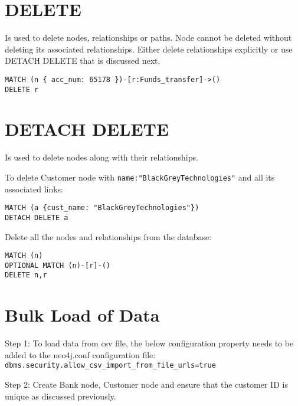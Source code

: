 \documentclass[../main.tex]{subfiles}
\begin{document}
\section{DELETE}
Is used to delete nodes, relationships or paths.
Node cannot be deleted without deleting its associated relationships. Either delete relationships explicitly or use DETACH DELETE that is discussed next.
\begin{lstlisting}[language=cypher]
MATCH (n { acc_num: 65178 })-[r:Funds_transfer]->()
DELETE r
\end{lstlisting}

\section{DETACH DELETE}
Is used to delete nodes along with their relationships.

To delete Customer node with \lstinline{name:"BlackGreyTechnologies"} and all its associated links:

\begin{lstlisting}[language=cypher]
MATCH (a {cust_name: "BlackGreyTechnologies"}) 
DETACH DELETE a
\end{lstlisting}
Delete all the nodes and relationships from the database:
\begin{lstlisting}[language=cypher]
MATCH (n)
OPTIONAL MATCH (n)-[r]-()
DELETE n,r
\end{lstlisting}

\section{Bulk Load of Data}

Step 1: 
To load data from csv file, the below configuration property needs to be added to the neo4j.conf configuration file:
\lstinline{dbms.security.allow_csv_import_from_file_urls=true}

Step 2:
Create Bank node, Customer node and ensure that the customer ID is unique as discussed previously.
\end{document}
